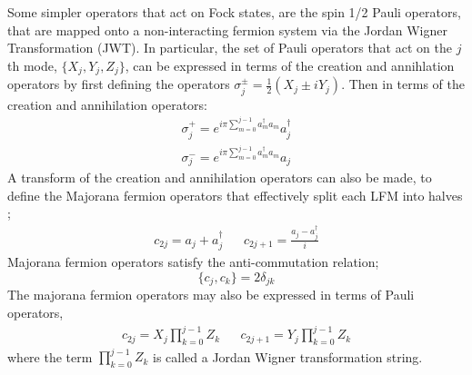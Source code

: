 Some simpler operators that act on Fock states, are the spin 1/2 Pauli operators, that are mapped onto a
non-interacting fermion system via the Jordan Wigner Transformation (JWT).
In particular, the set of Pauli operators that act on the $j$th mode,
$\{X_j, Y_j, Z_j\}$, can be expressed in terms of the creation and annihlation operators by first defining
the operators $\sigma^{\pm}_j = \frac{1}{2}(X_j \pm iY_j)$. Then in terms of the creation and annihilation
operators:
\begin{align}
    \sigma^{+}_j = e^{i\pi\sum^{j-1}_{m = 0} a^{\dagger}_m a_m} a_j^{\dagger} \\
    \sigma^{-}_j = e^{i\pi\sum^{j-1}_{m = 0} a^{\dagger}_m a_m} a_j
\end{align}
A transform of the creation and annihilation operators can also be made, to define the Majorana
fermion operators that effectively split each LFM into halves \cite{Bravyi2000};
\begin{align}
    c_{2j} = a_j + a_j^{\dagger} &  & c_{2j+1} = \frac{a_j - a_j^{\dagger}}{i}
\end{align}
Majorana fermion operators satisfy the anti-commutation relation;
\begin{equation}
    \{c_j, c_k\} = 2\delta_{jk}
\end{equation}
The majorana fermion operators may also be expressed in terms of Pauli operators,
\begin{align}
    c_{2j} = X_j \prod^{j-1}_{k=0} Z_k &  & c_{2j + 1} = Y_j \prod^{j-1}_{k=0} Z_k
\end{align}
where the term $\prod^{j-1}_{k=0} Z_k$ is called a Jordan Wigner transformation string.














